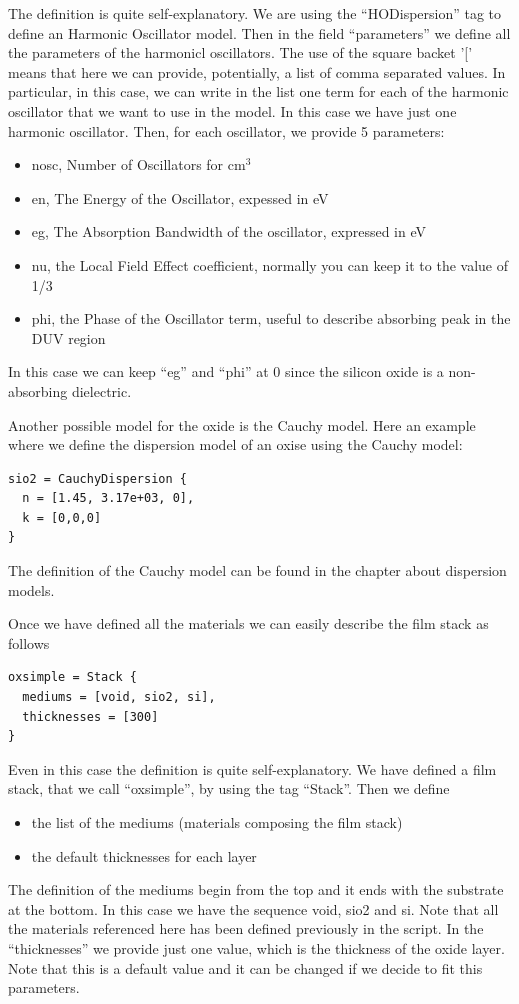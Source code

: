 \documentclass[a4paper]{report}
\begin{document}
The definition is quite self-explanatory. We are using the
``HODispersion'' tag to define an Harmonic Oscillator model. Then in
the field ``parameters'' we define all the parameters of the harmonicl
oscillators. The use of the square backet '[' means that here we can
provide, potentially, a list of comma separated values. In particular,
in this case, we can write in the list one term for each of the
harmonic oscillator that we want to use in the model. In this case we
have just one harmonic oscillator. Then, for each oscillator, we
provide 5 parameters:
\begin{itemize}
  \item nosc, Number of Oscillators for $\textrm{cm}^3$
  \item en, The Energy of the Oscillator, expessed in eV
  \item eg, The Absorption Bandwidth of the oscillator, expressed in
  eV
  \item nu, the Local Field Effect coefficient, normally you can keep
  it to the value of 1/3
  \item phi, the Phase of the Oscillator term, useful to describe
  absorbing peak in the DUV region
\end{itemize}
In this case we can keep ``eg'' and ``phi'' at 0 since the silicon
oxide is a non-absorbing dielectric.

Another possible model for the oxide is the Cauchy model.
Here an example where we define the dispersion model of an oxise using the Cauchy model:
\begin{verbatim}
sio2 = CauchyDispersion { 
  n = [1.45, 3.17e+03, 0], 
  k = [0,0,0]
}
\end{verbatim}

The definition of the Cauchy model can be found in the chapter about dispersion models.

Once we have defined all the materials we can easily describe the film
stack as follows
\begin{verbatim}
oxsimple = Stack {
  mediums = [void, sio2, si],
  thicknesses = [300]
}
\end{verbatim}

Even in this case the definition is quite self-explanatory. We have
defined a film stack, that we call ``oxsimple'', by using the tag
``Stack''. Then we define
\begin{itemize}
  \item the list of the mediums (materials composing the film stack)
  \item the default thicknesses for each layer
\end{itemize}
The definition of the mediums begin from the top and it ends with the
substrate at the bottom. In this case we have the sequence void, sio2
and si. Note that all the materials referenced here has been defined
previously in the script. In the ``thicknesses'' we provide just one
value, which is the thickness of the oxide layer. Note that this is a
default value and it can be changed if we decide to fit this
parameters.
\end{document}
